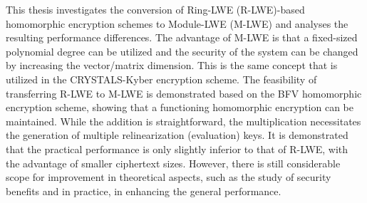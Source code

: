 This thesis investigates the conversion of Ring-LWE (R-LWE)-based homomorphic encryption schemes to Module-LWE (M-LWE) and analyses the resulting performance differences. The advantage of M-LWE is that a fixed-sized polynomial degree can be utilized and the security of the system can be changed by increasing the vector/matrix dimension. This is the same concept that is utilized in the CRYSTALS-Kyber encryption scheme. The feasibility of transferring R-LWE to M-LWE is demonstrated based on the BFV homomorphic encryption scheme, showing that a functioning homomorphic encryption can be maintained. While the addition is straightforward, the multiplication necessitates the generation of multiple relinearization (evaluation) keys. It is demonstrated that the practical performance is only slightly inferior to that of R-LWE, with the advantage of smaller ciphertext sizes. However, there is still considerable scope for improvement in theoretical aspects, such as the study of security benefits and in practice, in enhancing the general performance.
